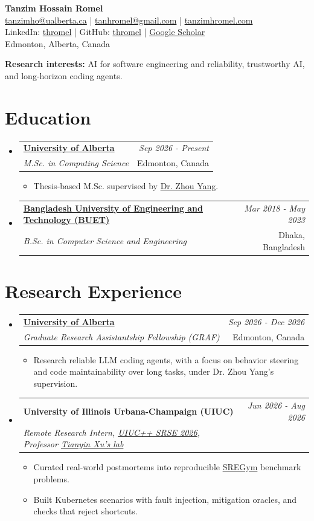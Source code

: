 \documentclass[a4paper,11pt]{article}
\makeatletter
\newcommand{\resumeSubheading}[4]{
\vspace{0.5mm}\item
    \begin{tabular*}{0.98\textwidth}[t]{l@{\extracolsep{\fill}}r}
        \textbf{#1} & \textit{\small{#4}} \\
        \textit{\small{#3}} &  \small{#2}\\
    \end{tabular*}
    \vspace{-2.4mm}
}
\newcommand{\resumeProject}[4]{
\vspace{0.5mm}\item
    \begin{tabular*}{0.98\textwidth}[t]{l@{\extracolsep{\fill}}r}
        \textbf{#1} & \textit{\small{#3}} \\
        \small{\textit{#2}} & \small{#4}
    \end{tabular*}
    \vspace{-2.4mm}
}
\newcommand{\resumeSubHeadingListStart}{\begin{itemize}[leftmargin=*,labelsep=1mm]}
\newcommand{\resumeItemListStart}{\begin{itemize}[leftmargin=*,labelsep=1mm,itemsep=0.5mm]}
\newcommand{\resumeSubHeadingListEnd}{\end{itemize}\vspace{2mm}}
\newcommand{\resumeItemListEnd}{\end{itemize}\vspace{-2mm}}
\newcommand{\headerfontiii}{\fontfamily{ppl}\selectfont} %
\makeatother
\begin{document}
\headerfontiii

\begin{center}
    {\Huge\textbf{Tanzim Hossain Romel}}\\[3pt]
    {\small\href{mailto:tanzimho@ualberta.ca}{tanzimho@ualberta.ca} | \href{mailto:tanhromel@gmail.com}{tanhromel@gmail.com} | \href{https://tanzimhromel.com}{tanzimhromel.com}}\\[2pt]
    {\small LinkedIn: \href{https://www.linkedin.com/in/thromel/}{thromel} | GitHub: \href{https://github.com/thromel}{thromel} | \href{https://scholar.google.com/citations?user=zHV4EU8AAAAJ}{Google Scholar}}\\[2pt]
    {\small Edmonton, Alberta, Canada}
\end{center}
\vspace{-3mm}
\normalsize
{\small\textbf{Research interests:} AI for software engineering and reliability, trustworthy AI, and long-horizon coding agents.}

\section{\textbf{Education}}
\resumeSubHeadingListStart
\resumeSubheading
{\href{https://www.ualberta.ca/en/computing-science/index.html}{University of Alberta}}{Edmonton, Canada}
{M.Sc. in Computing Science}{Sep 2026 - Present}
\resumeItemListStart
\item Thesis-based M.Sc. supervised by \href{https://apps.ualberta.ca/directory/person/zy25}{Dr. Zhou Yang}.
\resumeItemListEnd
\resumeSubheading
{\href{https://cse.buet.ac.bd/academics/bsc}{Bangladesh University of Engineering and Technology (BUET)}}{Dhaka, Bangladesh}
{B.Sc. in Computer Science and Engineering}{Mar 2018 - May 2023}
\resumeSubHeadingListEnd
\vspace{-4mm}

\section{\textbf{Research Experience}}
\resumeSubHeadingListStart
\resumeSubheading
{\href{https://www.ualberta.ca/en/computing-science/index.html}{University of Alberta}}{Edmonton, Canada}
{Graduate Research Assistantship Fellowship (GRAF)}{Sep 2026 - Dec 2026}
\resumeItemListStart
\item Research reliable LLM coding agents, with a focus on behavior steering and code maintainability over long tasks, under Dr. Zhou Yang's supervision.
\resumeItemListEnd
\resumeProject
{University of Illinois Urbana-Champaign (UIUC)}
{Remote Research Intern, \href{https://uiuc-srse.github.io/}{UIUC++ SRSE 2026}, Professor \href{https://tianyin.github.io/}{Tianyin Xu's lab}}
{Jun 2026 - Aug 2026}{}
\resumeItemListStart
\item Curated real-world postmortems into reproducible \href{https://sregym.com/blog/postmortems-to-sre-benchmarks}{SREGym} benchmark problems.
\item Built Kubernetes scenarios with fault injection, mitigation oracles, and checks that reject shortcuts.
\resumeItemListEnd
\resumeSubHeadingListEnd
\vspace{-4mm}
\end{document}

